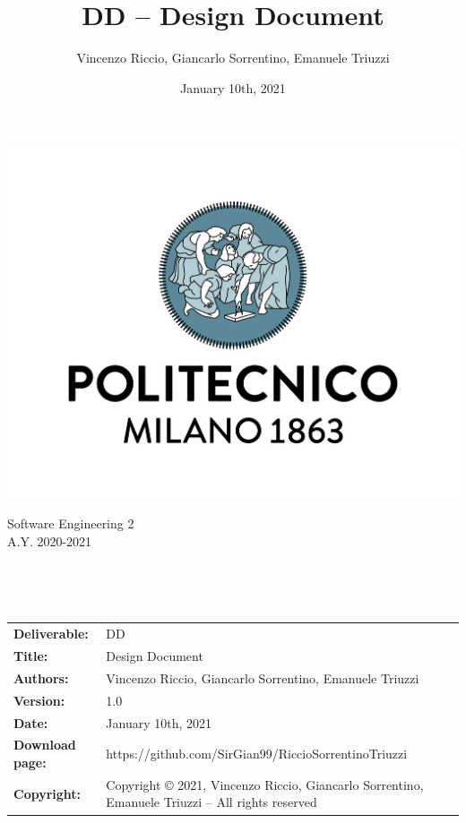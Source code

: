 \documentclass[a4paper,oneside,11pt]{book}
\title{\LARGE{DD -- Design Document}}
\author{Vincenzo Riccio, Giancarlo Sorrentino, Emanuele Triuzzi}
\date{January 10th, 2021}
\begin{document}
\begin{titlingpage} 
    \begin{center}
        \includegraphics[height=0.52\linewidth]{pictures/polimi}\\ %
        \begin{large}
            Software Engineering 2 \\
            A.Y. 2020-2021\\
        \end{large}
        \vspace{4cm} %
        \begin{large} 
            \textbf{\thetitle} \\
        \end{large}
        \vspace{0.7cm}
        \theauthor\\
        \vspace{7.3cm} %
        \thedate
    \end{center}
\end{titlingpage}

\newpage
\begin{table}[H]
    \begin{tabu} to \textwidth { X[0.3,r,p] X[0.7,l,p] }
        \hline
        \textbf{Deliverable:}   & DD\\
        \textbf{Title:}         & Design Document \\
        \textbf{Authors:}       & Vincenzo Riccio, Giancarlo Sorrentino, \newline Emanuele Triuzzi \\
        \textbf{Version:}       & 1.0 \\ 
        \textbf{Date:}          & January 10th, 2021 \\
        \textbf{Download page:} & https://github.com/SirGian99/RiccioSorrentinoTriuzzi \\
        \textbf{Copyright:}     & Copyright © 2021, Vincenzo Riccio, Giancarlo Sorrentino, Emanuele Triuzzi -- All rights reserved \\
        \hline
    \end{tabu}
\end{table}
\end{document}
